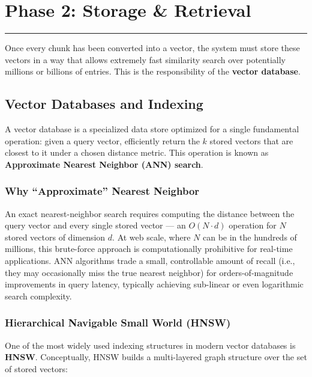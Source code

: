 \documentclass[11pt,a4paper]{article}
\newcommand{\sectionrule}{\vspace{-0.2cm}\noindent\textcolor{ragblue!40}{\rule{\linewidth}{0.6pt}}\vspace{0.3cm}}
\begin{document}
\newpage

\section{Phase 2: Storage \& Retrieval}
\sectionrule

Once every chunk has been converted into a vector, the system must store these vectors in a way that allows extremely fast similarity search over potentially millions or billions of entries. This is the responsibility of the \textbf{vector database}.

\subsection{Vector Databases and Indexing}

A vector database is a specialized data store optimized for a single fundamental operation: given a query vector, efficiently return the $k$ stored vectors that are closest to it under a chosen distance metric. This operation is known as \textbf{Approximate Nearest Neighbor (ANN) search}.

\subsubsection{Why ``Approximate'' Nearest Neighbor}

An exact nearest-neighbor search requires computing the distance between the query vector and every single stored vector --- an $O(N \cdot d)$ operation for $N$ stored vectors of dimension $d$. At web scale, where $N$ can be in the hundreds of millions, this brute-force approach is computationally prohibitive for real-time applications. ANN algorithms trade a small, controllable amount of recall (i.e., they may occasionally miss the true nearest neighbor) for orders-of-magnitude improvements in query latency, typically achieving sub-linear or even logarithmic search complexity.

\subsubsection{Hierarchical Navigable Small World (HNSW)}

One of the most widely used indexing structures in modern vector databases is \textbf{HNSW}. Conceptually, HNSW builds a multi-layered graph structure over the set of stored vectors:
\end{document}
